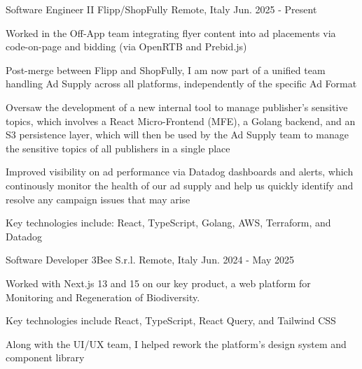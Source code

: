 
\begin{cventries}

	\cventry
	{Software Engineer II} %
	{Flipp/ShopFully} %
	{Remote, Italy} %
	{Jun. 2025 - Present} %
	{
		\begin{cvitems} %
			\item {Worked in the Off-App team integrating flyer content into ad placements via code-on-page and bidding (via OpenRTB and Prebid.js)}
			\item {Post-merge between Flipp and ShopFully, I am now part of a unified team handling Ad Supply across all platforms, independently of the specific Ad Format}
			\item {Oversaw the development of a new internal tool to manage publisher's sensitive topics, which involves a React Micro-Frontend (MFE), a Golang backend, and an S3 persistence layer, which will then be used by the Ad Supply team to manage the sensitive topics of all publishers in a single place}
			\item {Improved visibility on ad performance via Datadog dashboards and alerts, which continously monitor the health of our ad supply and help us quickly identify and resolve any campaign issues that may arise}
			\item {Key technologies include: React, TypeScript, Golang, AWS, Terraform, and Datadog}
		\end{cvitems}
	}

	\cventry
	{Software Developer} %
	{3Bee S.r.l.} %
	{Remote, Italy} %
	{Jun. 2024 - May 2025} %
	{
		\begin{cvitems} %
			\item {Worked with Next.js 13 and 15 on our key product, a web platform for Monitoring and Regeneration of Biodiversity.}
			\item {Key technologies include React, TypeScript, React Query, and Tailwind CSS}
			\item {Along with the UI/UX team, I helped rework the platform's design system and component library}
		\end{cvitems}
	}


\end{cventries}

